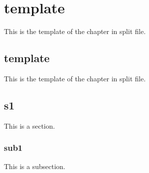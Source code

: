 \thesisappendix


\chapter{template}

This is the template of the chapter in split file.


\section{template}

This is the template of the chapter in split file.


\section{s1}

This is a section.

\subsection{sub1}

This is a subsection.
